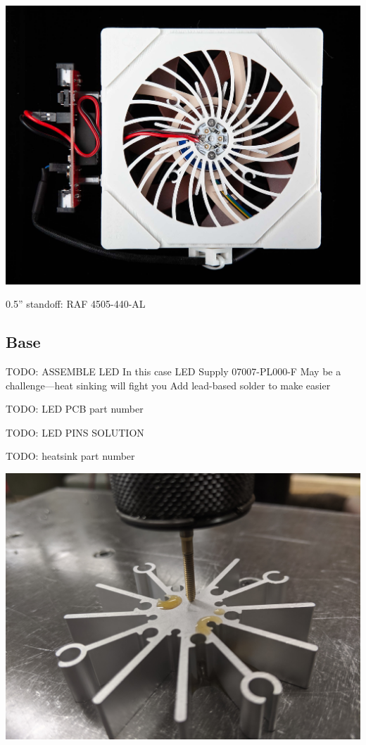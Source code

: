 \documentclass[11pt]{article}
\begin{document}
\includegraphics[width=\textwidth]{"./assembly-coverart.jpg"}

0.5'' standoff: RAF 4505-440-AL

\subsection{Base}

TODO: ASSEMBLE LED
In this case LED Supply 07007-PL000-F
May be a challenge---heat sinking will fight you
Add lead-based solder to make easier

TODO: LED PCB part number

TODO: LED PINS SOLUTION

TODO: heatsink part number

\begin{center}
  \includegraphics[width=\textwidth/2]{"./tap-heatsink.jpg"}
\end{center}
\end{document}
